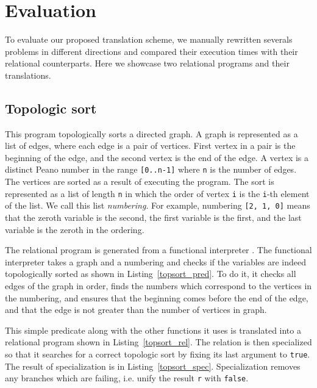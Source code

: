 \section{Evaluation}

To evaluate our proposed translation scheme, we manually rewritten severals problems in different directions and compared their execution times with their relational counterparts.
Here we showcase two relational programs and their translations.

\subsection{Topologic sort}





This program topologically sorts a directed graph.
A graph is represented as a list of edges, where each edge is a pair of vertices.
First vertex in a pair is the beginning of the edge, and the second vertex is the end of the edge.
A vertex is a distinct Peano number in the range \lstinline{[0..n-1]} where \lstinline{n} is the number of edges.
The vertices are sorted as a result of executing the program.
The sort is represented as a list of length \lstinline{n} in which the order of vertex \lstinline{i} is the \lstinline{i}-th element of the list.
We call this list \emph{numbering}.
For example, numbering \lstinline{[2, 1, 0]} means that the zeroth variable is the second, the first variable is the first, and the last variable is the zeroth in the ordering.

The relational program is generated from a functional interpreter .
The functional interpreter takes a graph and a numbering and checks if the variables are indeed topologically sorted as shown in Listing~\ref{topsort_pred}.
To do it, it checks all edges of the graph in order, finds the numbers which correspond to the vertices in the numbering, and ensures that the beginning comes before the end of the edge, and that the edge is not greater than the number of vertices in graph.

This simple predicate along with the other functions it uses is translated into a relational program shown in Listing~\ref{topsort_rel}.
The relation is then specialized so that it searches for a correct topologic sort by fixing its last argument to \lstinline{true}.
The result of specialization is in Listing~\ref{topsort_spec}.
Specialization removes any \conde branches which are failing, i.e. unify the result \lstinline{r} with \lstinline{false}.

